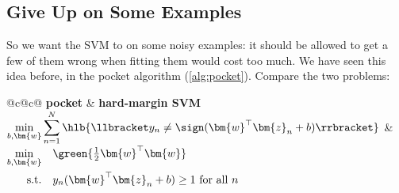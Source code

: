 \subsection{Give Up on Some Examples}

So we want the SVM to  on some noisy examples: it
should be allowed to get a few of them wrong when fitting them would cost
too much. We have seen this idea before, in the pocket algorithm
(\autoref{alg:pocket}). Compare the two problems:

\begin{center}
    \begin{tabular}{@{}c@{\qquad}c@{}}
        \textbf{pocket} & \textbf{hard-margin SVM}\\[4pt]
        \(\displaystyle \min_{b, \bm{w}} \sum_{n=1}^N \hlb{\llbracket y_n
            \neq \sign(\bm{w}^\top \bm{z}_n + b) \rrbracket}\)
        &
        \(\begin{aligned}
            \min_{b, \bm{w}} \quad & \green{\tfrac{1}{2} \bm{w}^\top
                \bm{w}}\\
            \text{s.t.} \quad & y_n (\bm{w}^\top \bm{z}_n + b) \ge 1
                \text{ for all } n
        \end{aligned}\)
    \end{tabular}
\end{center}

